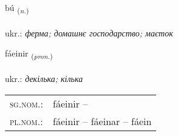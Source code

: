 \documentclass[frontgrid, backgrid]{flacards}\usepackage[]{graphicx}\usepackage[]{xcolor}
\begin{document}
\renewcommand{\flhead}{\vskip5pt \fboxsep=0pt {\small\bfseries\footnotesize Nafnorð | іменник}}
\renewcommand{\fcfoot}{\vskip5pt \fboxsep=0pt \hspace{2pt}{\small\bfseries\footnotesize 2K}}

\renewcommand{\blhead}{\vskip5pt {\small\bfseries\footnotesize Nafnorð | іменник }}
\renewcommand{\bcfoot}{\vskip5pt \hspace{2pt}{\small\bfseries\footnotesize 2K}}


{bú \small{\textsubscript{(\textit{n.})}} \\[1ex] %
\textphonetic{[puː]} \\
ukr.: \emph{ферма; домашнє господарство; маєток} \\  [2ex]
\renewcommand*{\arraystretch}{0.8}
}

\renewcommand{\flhead}{\vskip5pt \fboxsep=0pt {\small\bfseries\footnotesize Fornafn | займенник}}
\renewcommand{\fcfoot}{\vskip5pt \fboxsep=0pt \hspace{2pt}{\small\bfseries\footnotesize 2K}}

\renewcommand{\blhead}{\vskip5pt {\small\bfseries\footnotesize Fornafn | займенник }}
\renewcommand{\bcfoot}{\vskip5pt \hspace{2pt}{\small\bfseries\footnotesize 2K}}


{fáeinir \small{\textsubscript{(\textit{pron.})}} \\[1ex] %
\textphonetic{[fauːeinɪr]} \\
ukr.: \emph{декілька; кілька} \\  [2ex]
\renewcommand*{\arraystretch}{0.8}
\begin{tabular}{ll}
\textsc{sg.nom.}: & fáeinir  -- \\ 
\textsc{pl.nom.}: & fáeinir -- fáeinar -- fáein
\end{tabular}
}
\end{document}
